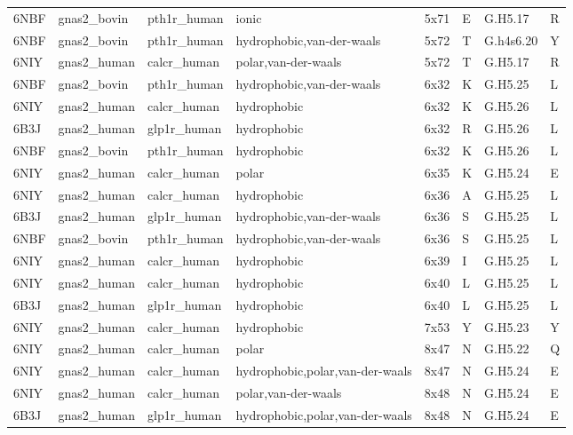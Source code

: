 \begin{landscape}
\begin{longtable}{llllllll}
6NBF & gnas2\_bovin & pth1r\_human & ionic & 5x71 & E & G.H5.17 & R\\
6NBF & gnas2\_bovin & pth1r\_human & hydrophobic,van-der-waals & 5x72 & T & G.h4s6.20 & Y\\
6NIY & gnas2\_human & calcr\_human & polar,van-der-waals & 5x72 & T & G.H5.17 & R\\
\addlinespace
6NBF & gnas2\_bovin & pth1r\_human & hydrophobic,van-der-waals & 6x32 & K & G.H5.25 & L\\
6NIY & gnas2\_human & calcr\_human & hydrophobic & 6x32 & K & G.H5.26 & L\\
6B3J & gnas2\_human & glp1r\_human & hydrophobic & 6x32 & R & G.H5.26 & L\\
6NBF & gnas2\_bovin & pth1r\_human & hydrophobic & 6x32 & K & G.H5.26 & L\\
6NIY & gnas2\_human & calcr\_human & polar & 6x35 & K & G.H5.24 & E\\
\addlinespace
6NIY & gnas2\_human & calcr\_human & hydrophobic & 6x36 & A & G.H5.25 & L\\
6B3J & gnas2\_human & glp1r\_human & hydrophobic,van-der-waals & 6x36 & S & G.H5.25 & L\\
6NBF & gnas2\_bovin & pth1r\_human & hydrophobic,van-der-waals & 6x36 & S & G.H5.25 & L\\
6NIY & gnas2\_human & calcr\_human & hydrophobic & 6x39 & I & G.H5.25 & L\\
6NIY & gnas2\_human & calcr\_human & hydrophobic & 6x40 & L & G.H5.25 & L\\
\addlinespace
6B3J & gnas2\_human & glp1r\_human & hydrophobic & 6x40 & L & G.H5.25 & L\\
6NIY & gnas2\_human & calcr\_human & hydrophobic & 7x53 & Y & G.H5.23 & Y\\
6NIY & gnas2\_human & calcr\_human & polar & 8x47 & N & G.H5.22 & Q\\
6NIY & gnas2\_human & calcr\_human & hydrophobic,polar,van-der-waals & 8x47 & N & G.H5.24 & E\\
6NIY & gnas2\_human & calcr\_human & polar,van-der-waals & 8x48 & N & G.H5.24 & E\\
\addlinespace
6B3J & gnas2\_human & glp1r\_human & hydrophobic,polar,van-der-waals & 8x48 & N & G.H5.24 & E\\*
\end{longtable}
\end{landscape}

